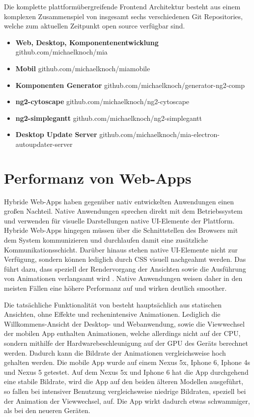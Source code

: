 Die komplette plattformübergreifende Frontend Architektur besteht aus einem komplexen Zusammenspiel von insgesamt sechs verschiedenen Git Repositories,
welche zum aktuellen Zeitpunkt open source verfügbar sind.

\begin{itemize}
  \item{\textbf{Web, Desktop, Komponentenentwicklung} github.com/michaelknoch/mia}
  \item{\textbf{Mobil} github.com/michaelknoch/miamobile}
  \item{\textbf{Komponenten Generator} github.com/michaelknoch/generator-ng2-comp}
  \item{\textbf{ng2-cytoscape} github.com/michaelknoch/ng2-cytoscape}
  \item{\textbf{ng2-simplegantt} github.com/michaelknoch/ng2-simplegantt}
  \item{\textbf{Desktop Update Server} github.com/michaelknoch/mia-electron-autoupdater-server}
\end{itemize}

\section{Performanz von Web-Apps}

Hybride Web-Apps haben gegenüber nativ entwickelten Anwendungen einen großen Nachteil.
Native Anwendungen sprechen direkt mit dem Betriebssystem und verwenden für visuelle Darstellungen native \ac{UI}-Elemente der Plattform.
Hybride Web-Apps hingegen müssen über die Schnittstellen des Browsers mit dem System kommunizieren
und durchlaufen damit eine zusätzliche Kommunikationsschicht.
Darüber hinaus stehen native \ac{UI}-Elemente nicht zur Verfügung, sondern können lediglich durch \ac{CSS} visuell nachgeahmt werden.
Das führt dazu, dass speziell der Rendervorgang der Ansichten sowie die Ausführung von Animationen verlangsamt wird \cite{Webvs43:online}.
Native Anwendungen weisen daher in den meisten Fällen eine höhere Performanz auf und wirken deutlich
smoother.

Die tatsächliche Funktionalität von \projectname{} besteht hauptsächlich aus statischen Ansichten, ohne Effekte und
rechenintensive Animationen. Lediglich die Willkommens-Ansicht der Desktop- und Webanwendung,
sowie die Viewwechsel der mobilen App enthalten Animationen, welche allerdings nicht auf der CPU,
sondern mithilfe der Hardwarebeschleunigung auf der GPU des Geräts berechnet werden.
Dadurch kann die Bildrate der Animationen vergleichsweise hoch gehalten werden.
Die mobile App wurde auf einem Nexus 5x, Iphone 6, Iphone 4s und Nexus 5 getestet.
Auf dem Nexus 5x und Iphone 6 hat die App durchgehend eine stabile Bildrate,
wird die App auf den beiden älteren Modellen ausgeführt,
so fallen bei intensiver Benutzung vergleichsweise niedrige
Bildraten, speziell bei der Animation der Viewwechsel, auf.
Die App wirkt dadurch etwas schwammiger, als bei den neueren Geräten.

